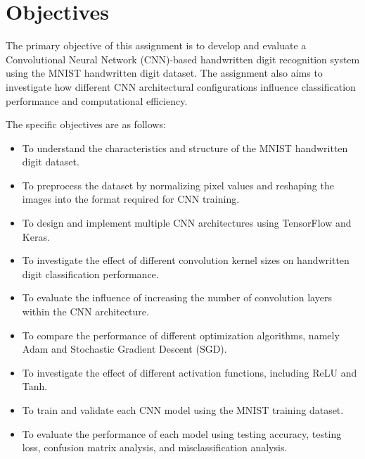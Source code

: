 
\section{Objectives}

The primary objective of this assignment is to develop and evaluate a Convolutional Neural Network (CNN)-based handwritten digit recognition system using the MNIST handwritten digit dataset. The assignment also aims to investigate how different CNN architectural configurations influence classification performance and computational efficiency.

The specific objectives are as follows:

\begin{itemize}

\item To understand the characteristics and structure of the MNIST handwritten digit dataset.

\item To preprocess the dataset by normalizing pixel values and reshaping the images into the format required for CNN training.

\item To design and implement multiple CNN architectures using TensorFlow and Keras.

\item To investigate the effect of different convolution kernel sizes on handwritten digit classification performance.

\item To evaluate the influence of increasing the number of convolution layers within the CNN architecture.

\item To compare the performance of different optimization algorithms, namely Adam and Stochastic Gradient Descent (SGD).

\item To investigate the effect of different activation functions, including ReLU and Tanh.

\item To train and validate each CNN model using the MNIST training dataset.

\item To evaluate the performance of each model using testing accuracy, testing loss, confusion matrix analysis, and misclassification analysis.


\end{itemize}
